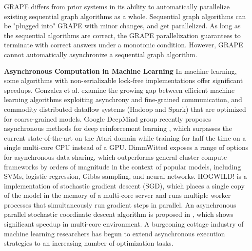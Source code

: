 \documentclass{vldb}
\begin{document}

GRAPE \cite{Fan:2017:PSG:3035918.3035942} differs from prior systems in its ability to automatically parallelize existing sequential graph algorithms as a whole. Sequential graph algorithms can be "plugged into" GRAPE with minor changes, and get parallelized. As long as the sequential algorithms are correct, the GRAPE parallelization guarantees to terminate with correct answers under a monotonic condition. However, GRAPE cannot automatically asynchronize a sequential graph algorithm.


\noindent\textbf{Asynchronous Computation in Machine Learning} In machine learning, some algorithms with non-serializable lock-free implementations offer significant speedups. Gonzalez et al. \cite{DBLP:journals/corr/GonzalezBJFHGS15} examine the growing gap between efficient machine learning algorithms exploiting asynchrony and fine-grained communication, and commodity distributed dataflow systems (Hadoop and Spark) that are optimized for coarse-grained models. Google DeepMind group recently proposes asynchronous methods for deep reinforcement learning \cite{Mnih:2016:AMD:3045390.3045594}, which surpasses the current state-of-the-art on the Atari domain while training for half the time on a single multi-core CPU instead of a GPU. DimmWitted \cite{Zhang:2014:DSM:2732977.2733001} exposes a range of options for asynchronous data sharing, which outperforms general cluster compute frameworks by orders of magnitude in the context of popular models, including SVMs, logistic regression, Gibbs sampling, and neural networks. HOGWILD! \cite{Niu:2011:HLA:2986459.2986537} is a implementation of stochastic gradient descent (SGD), which places a single copy of the model in the memory of a multi-core server and runs multiple worker processes that simultaneously run gradient steps in parallel. An asynchronous parallel stochastic coordinate descent algorithm is proposed in \cite{Liu:2015:APS:2789272.2789282}, which shows significant speedup in multi-core environment. A burgeoning cottage industry of machine learning researchers has begun to extend asynchronous execution strategies to an increasing number of optimization tasks.
\end{document}
